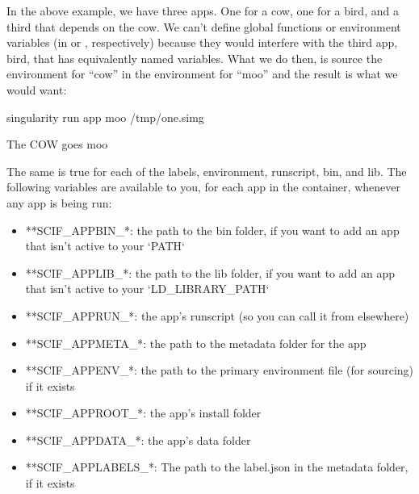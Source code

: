 \documentclass[letterpaper,10pt,english]{sphinxmanual}
\begin{document}
In the above example, we have three apps. One for a cow, one for a bird,
and a third that depends on the cow. We can’t define global functions or
environment variables (in  or   , respectively) because they would
interfere with the third app, bird, that has equivalently named
variables. What we do then, is source the environment for “cow” in the
environment for “moo” and the result is what we would want:

%
\begin{sphinxVerbatim}[commandchars=\\\{\}]
\PYGZdl{} singularity run \PYGZhy{}\PYGZhy{}app moo /tmp/one.simg

The COW goes moo
\end{sphinxVerbatim}

The same is true for each of the labels, environment, runscript, bin,
and lib. The following variables are available to you, for each app in
the container, whenever any app is being run:
\begin{itemize}
\item {} 
**SCIF\_APPBIN\_*: the path to the bin folder, if you want to add
an app that isn’t active to your ‘PATH‘

\item {} 
**SCIF\_APPLIB\_*: the path to the lib folder, if you want to add
an app that isn’t active to your ‘LD\_LIBRARY\_PATH‘

\item {} 
**SCIF\_APPRUN\_*: the app’s runscript (so you can call it from
elsewhere)

\item {} 
**SCIF\_APPMETA\_*: the path to the metadata folder for the app

\item {} 
**SCIF\_APPENV\_*: the path to the primary environment file (for
sourcing) if it exists

\item {} 
**SCIF\_APPROOT\_*: the app’s install folder

\item {} 
**SCIF\_APPDATA\_*: the app’s data folder

\item {} 
**SCIF\_APPLABELS\_*: The path to the label.json in the metadata
folder, if it exists

\end{itemize}
\end{document}
